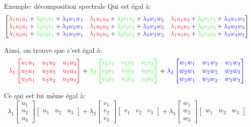 \documentclass[a4paper]{article}
\begin{document}
\begin{parag}{Exemple: décomposition spectrale}
    Qui est égal à:
    \[\begin{bmatrix}
        {\color{red}\lambda_1 u_1 u_1} + {\color{green}\lambda_2 v_1 v_1} + {\color{blue}\lambda_3 w_1 w_1} & {\color{red} \lambda_1 u_1 u_2} + {\color{green}\lambda_2 v_1 v_2} + {\color{blue}\lambda_3 w_1 w_2} & {\color{red}\lambda_1 u_1 u_3} + {\color{green}\lambda_2 v_1 v_3} + {\color{blue}\lambda_3 w_1 w_3} \\
        {\color{red}\lambda_1 u_2 u_1} + {\color{green}\lambda_2 v_2 v_1} + {\color{blue}\lambda_3 w_2 w_1} & {\color{red} \lambda_1 u_2 u_2} + {\color{green}\lambda_2 v_2 v_2} + {\color{blue}\lambda_3 w_2 w_2} & {\color{red}\lambda_1 u_2 u_3} + {\color{green}\lambda_2 v_2 v_3} + {\color{blue}\lambda_3 w_2 w_3} \\
        {\color{red}\lambda_1 u_3 u_1} + {\color{green}\lambda_2 v_3 v_1} + {\color{blue}\lambda_3 w_3 w_1} & {\color{red} \lambda_1 u_3 u_2} + {\color{green}\lambda_2 v_3 v_2} + {\color{blue}\lambda_3 w_3 w_2} & {\color{red}\lambda_1 u_3 u_3} + {\color{green}\lambda_2 v_3 v_3} + {\color{blue}\lambda_3 w_3 w_3}
    \end{bmatrix}\]

    Ainsi, on trouve que c'est égal à:
    \[{\color{red} \lambda_1 \begin{bmatrix} u_1 u_1 & u_1 u_2 & u_1 u_3 \\ u_2 u_1 & u_2 u_2 & u_2 u_3 \\ u_3 u_1 & u_3 u_2 & u_3 u_3 \end{bmatrix} } + {\color{green} \lambda_2 \begin{bmatrix} v_1 v_1 & v_1 v_2 & v_1 v_3 \\ v_2 v_1 & v_2 v_2 & v_2 v_3 \\ v_3 v_1 & v_3 v_2 & v_3 v_3 \end{bmatrix} } + {\color{blue} \lambda_3 \begin{bmatrix} w_1 w_1 & w_1 w_2 & w_1 w_3 \\ w_2 w_1 & w_2 w_2 & w_2 w_3 \\ w_3 w_1 & w_3 w_2 & w_3 w_3 \end{bmatrix} }\]

    Ce qui est lui même égal à:
    \[\lambda_1 \begin{bmatrix} u_1 \\ u_2 \\ u_3 \end{bmatrix} \begin{bmatrix} u_1 & u_2 & u_3 \end{bmatrix} + \lambda_2 \begin{bmatrix} v_1 \\ v_2 \\ v_3 \end{bmatrix} \begin{bmatrix} v_1 & v_2 & v_3 \end{bmatrix} + \lambda_3 \begin{bmatrix} w_1 \\ w_2 \\ w_3 \end{bmatrix} \begin{bmatrix} w_1 & w_2 & w_3 \end{bmatrix}\]


\end{parag}
\end{document}
